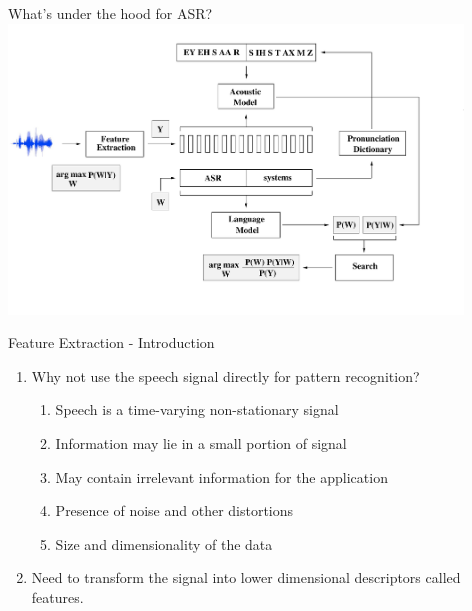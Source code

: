 \begin{frame}{What's under the hood for ASR?}
\includegraphics[height=77mm]{figures/ASR9}
\end{frame}

\begin{frame}{Feature Extraction - Introduction}
\begin{enumerate}
\item Why not use the speech signal directly for pattern recognition?
\begin{enumerate}
\item Speech is a \alert{time-varying non-stationary signal}
\item Information may lie in a \alert{small portion} of signal
\item May contain \alert{irrelevant information} for the application
\item Presence of \alert{noise and other distortions}
\item \alert{Size and dimensionality} of the data
\end{enumerate}
\item Need to transform the signal into lower dimensional descriptors called \alert{features}.
\end{enumerate}
\end{frame}

